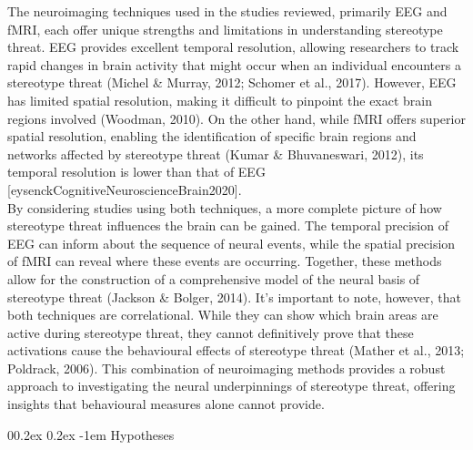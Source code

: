 \documentclass[
  stu, a4paper,floatsintext]{apa7}
\makeatletter
\let\oldparagraph\paragraph
\renewcommand{\paragraph}[1]{\oldparagraph{#1}\mbox{}}
\renewcommand{\paragraph}{\@startsection{paragraph}{4}{\parindent}%
  {0\baselineskip \@plus 0.2ex \@minus 0.2ex}%
  {-1em}%
  {\normalfont\normalsize\bfseries\itshape\typesectitle}}
\renewcommand{\paragraph}{\@startsection{paragraph}{4}{\parindent}%
  {0\baselineskip \@plus 0.2ex \@minus 0.2ex}%
  {-1em}%
  {\normalfont\normalsize\bfseries\typesectitle}}
\makeatother
\begin{document}
The neuroimaging techniques used in the studies reviewed, primarily EEG and fMRI, each offer unique strengths and limitations in understanding stereotype threat.
EEG provides excellent temporal resolution, allowing researchers to track rapid changes in brain activity that might occur when an individual encounters a stereotype threat (Michel \& Murray, 2012; Schomer et al., 2017).
However, EEG has limited spatial resolution, making it difficult to pinpoint the exact brain regions involved (Woodman, 2010).
On the other hand, while fMRI offers superior spatial resolution, enabling the identification of specific brain regions and networks affected by stereotype threat (Kumar \& Bhuvaneswari, 2012), its temporal resolution is lower than that of EEG {[}eysenckCognitiveNeuroscienceBrain2020{]}.\\
By considering studies using both techniques, a more complete picture of how stereotype threat influences the brain can be gained. The temporal precision of EEG can inform about the sequence of neural events, while the spatial precision of fMRI can reveal where these events are occurring. Together, these methods allow for the construction of a comprehensive model of the neural basis of stereotype threat (Jackson \& Bolger, 2014).
It's important to note, however, that both techniques are correlational.
While they can show which brain areas are active during stereotype threat, they cannot definitively prove that these activations cause the behavioural effects of stereotype threat (Mather et al., 2013; Poldrack, 2006).
This combination of neuroimaging methods provides a robust approach to investigating the neural underpinnings of stereotype threat, offering insights that behavioural measures alone cannot provide.

\paragraph{Hypotheses}\label{hypotheses}
\end{document}
